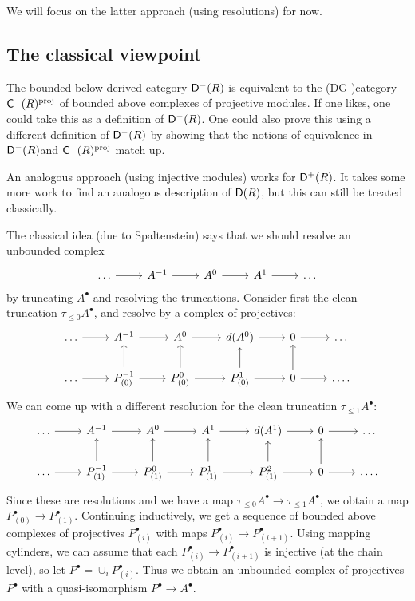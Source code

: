 \documentclass{amsart}
\begin{document}
We will focus on the latter approach (using resolutions) for now.

\subsection{The classical viewpoint}

\begin{ex}
	The bounded below derived category $\mathsf{D}^-(R)$ is equivalent to the (DG-)category $\mathsf{C}^-(R)^{\mathrm{proj}}$ of bounded above complexes of projective modules.
	If one likes, one could take this as a definition of $\mathsf{D}^-(R)$.
	One could also prove this using a different definition of $\mathsf{D}^-(R)$ by showing that the notions of equivalence in $\mathsf{D}^-(R)$and $\mathsf{C}^-(R)^{\mathrm{proj}}$ match up.
\end{ex}

An analogous approach (using injective modules) works for $\mathsf{D}^+(R)$.
It takes some more work to find an analogous description of $\mathsf{D}(R)$, but this can still be treated classically.

The classical idea (due to Spaltenstein) says that we should resolve an unbounded complex
\[
	\begin{tikzcd}
		\dots \rar & A^{-1} \rar & A^0 \rar & A^1 \rar & \dots
	\end{tikzcd}
\]
by truncating $A^\bullet$ and resolving the truncations.
Consider first the clean truncation $\tau_{\leq 0} A^\bullet$, and resolve by a complex of projectives:
\[
	\begin{tikzcd}
		\dots \rar & A^{-1} \rar & A^0 \rar & d(A^0) \rar & 0 \rar & \dots \\
		\dots \rar & P_{(0)}^{-1} \rar \uar & P_{(0)}^0 \rar \uar & P_{(0)}^1 \rar \uar & 0 \rar \uar & \dots.
	\end{tikzcd}
\]
We can come up with a different resolution for the clean truncation $\tau_{\leq 1} A^\bullet$:
\[
	\begin{tikzcd}
		\dots \rar & A^{-1} \rar & A^0 \rar & A^1 \rar & d(A^1) \rar & 0 \rar & \dots \\
		\dots \rar & P_{(1)}^{-1} \rar \uar & P_{(1)}^0 \rar \uar & P_{(1)}^1 \rar \uar & P_{(1)}^2 \rar \uar & 0 \rar \uar & \dots.
	\end{tikzcd}
\]
Since these are resolutions and we have a map $\tau_{\leq 0} A^\bullet \to \tau_{\leq 1} A^\bullet$, we obtain a map $P_{(0)}^\bullet \to P_{(1)}^\bullet$.
Continuing inductively, we get a sequence of bounded above complexes of projectives $P_{(i)}^\bullet$ with maps $P_{(i)}^\bullet \to P_{(i+1)}^\bullet$.
Using mapping cylinders, we can assume that each $P_{(i)}^\bullet \to P_{(i+1)}^\bullet$ is injective (at the chain level), so let $P^\bullet = \cup_i P_{(i)}^\bullet$.
Thus we obtain an unbounded complex of projectives $P^\bullet$ with a quasi-isomorphism $P^\bullet \to A^\bullet$.
\end{document}
